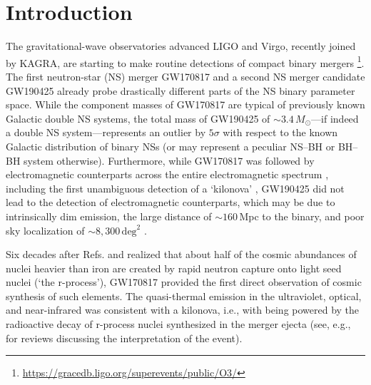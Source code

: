 
\section{Introduction}\label{sec:intro}

The gravitational-wave observatories advanced LIGO and Virgo, recently joined by KAGRA, are starting to make routine detections of compact binary mergers \cite{LIGOScientific:2018mvr,LIGOScientific:2020stg,Abbott:2020uma}\footnote{\href{https://gracedb.ligo.org/superevents/public/O3/}{https://gracedb.ligo.org/superevents/public/O3/}}. The first neutron-star (NS) merger GW170817 \cite{TheLIGOScientific:2017qsa} and a second NS merger candidate GW190425 \cite{Abbott:2020uma} already probe drastically different parts of the NS binary parameter space. While the component masses of GW170817 are typical of previously known Galactic double NS systems, the total mass of GW190425 of $\sim\!3.4\,M_\odot$---if indeed a double NS system---represents an outlier by $5\sigma$ with respect to the known Galactic distribution of binary NSs \cite{Abbott:2020uma} (or may represent a peculiar NS--BH or BH--BH system otherwise). Furthermore, while GW170817 was followed by electromagnetic counterparts across the entire electromagnetic spectrum \cite{abbott_multi-messenger_2017}, including the first unambiguous detection of a `kilonova' \cite{li_transient_1998-1,Kulkarni:2005jw,metzger_electromagnetic_2010,metzger_kilonovae_2019}, GW190425 did not lead to the detection of electromagnetic counterparts, which may be due to intrinsically dim emission, the large distance of $\sim\!160$\,Mpc to the binary, and poor sky localization of $\sim\!8,300\,\mathrm{deg}^2$ \cite{Abbott:2020uma,Antier:2019pzz,Hosseinzadeh:2019ifm,Coughlin:2019zqi}.

Six decades after Refs. \cite{burbidge_synthesis_1957-1} and \cite{cameron_origin_1957} realized that about half of the cosmic abundances of nuclei heavier than iron are created by rapid neutron capture onto light seed nuclei (`the r-process'), GW170817 provided the first direct observation of cosmic synthesis of such elements. The quasi-thermal emission in the ultraviolet, optical, and near-infrared was consistent with a kilonova, i.e., with being powered by the radioactive decay of r-process nuclei synthesized in the merger ejecta (see, e.g., \cite{metzger_kilonovae_2019,Siegel:2019mlp} for reviews discussing the interpretation of the event).

